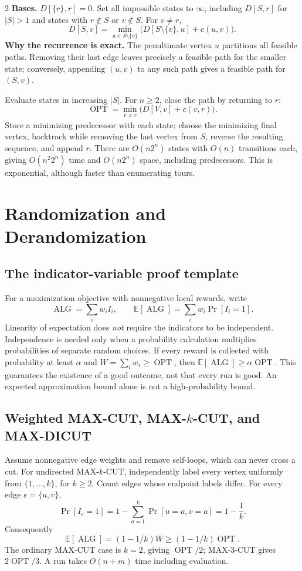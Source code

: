 \documentclass[8pt]{extarticle}
\theoremstyle{definition}
\newcommand{\OPT}{\operatorname{OPT}}
\newcommand{\ALG}{\operatorname{ALG}}
\begin{document}
\begin{multicols*}{2}
\textbf{Bases.} $D[\{r\},r]=0$.  Set all impossible states to $\infty$,
including $D[S,r]$ for $|S|>1$ and states with $r\notin S$ or $v\notin S$.
For $v\ne r$,
\[
\boxed{\ D[S,v]=\min_{u\in S\setminus\{v\}}
        \bigl(D[S\setminus\{v\},u]+c(u,v)\bigr).\ }
\]
\textbf{Why the recurrence is exact.} The penultimate vertex $u$ partitions
all feasible paths.  Removing their last edge leaves precisely a feasible
path for the smaller state; conversely, appending $(u,v)$ to any such path
gives a feasible path for $(S,v)$.

Evaluate states in increasing $|S|$.  For $n\ge2$, close the path by returning
to $r$:
\[
\OPT=\min_{v\ne r}\bigl(D[V,v]+c(v,r)\bigr).
\]
Store a minimizing predecessor with each state; choose the minimizing final
vertex, backtrack while removing the last vertex from $S$, reverse the
resulting sequence, and append $r$.  There are $O(n2^n)$ states with $O(n)$
transitions each, giving $O(n^2 2^n)$ time and $O(n2^n)$ space, including
predecessors.  This is exponential, although faster than enumerating tours.


\clearpage

\section{Randomization and Derandomization}\label{ra:main}

\subsection{The indicator-variable proof template}
For a maximization objective with nonnegative local rewards, write
\[
  \ALG=\sum_i w_i I_i,\qquad
  \mathbb E[\ALG]=\sum_i w_i\Pr[I_i=1].
\]
Linearity of expectation does \emph{not} require the indicators to be
independent. Independence is needed only when a probability calculation
multiplies probabilities of separate random choices. If every reward is
collected with probability at least $\alpha$ and
$W=\sum_iw_i\ge\OPT$, then $\mathbb E[\ALG]\ge\alpha\OPT$.
This guarantees the existence of a good outcome, not that every run is good.
An expected approximation bound alone is not a high-probability bound.

\subsection{Weighted MAX-CUT, MAX-\texorpdfstring{$k$}{k}-CUT, and MAX-DICUT}
Assume nonnegative edge weights and remove self-loops, which can never cross
a cut. For undirected MAX-$k$-CUT, independently label every vertex uniformly
from $\{1,\ldots,k\}$, for $k\ge2$. Count edges whose endpoint labels differ.
For every edge $e=\{u,v\}$,
\[
  \Pr[I_e=1]=1-\sum_{a=1}^k\Pr[u=a,v=a]=1-\frac1k.
\]
Consequently
\[
  \mathbb E[\ALG]=(1-1/k)W\ge(1-1/k)\OPT.
\]
The ordinary MAX-CUT case is $k=2$, giving $\OPT/2$; MAX-3-CUT gives
$2\OPT/3$. A run takes $O(n+m)$ time including evaluation.


\end{multicols*}
\end{document}
